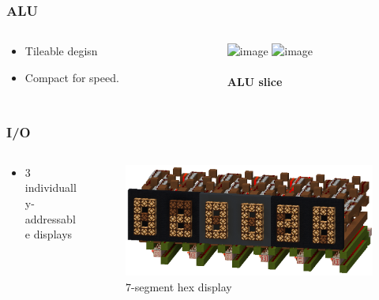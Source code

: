 \documentclass[aspectratio=169]{beamer}
\begin{document}
\begin{frame}
	\frametitle{ALU}
	\begin{columns}
		\begin{column}{0.4\textwidth}
			\begin{itemize}
				\item Tileable degisn
				\item Compact for speed.
			\end{itemize}
		\end{column}
		\begin{column}{0.6\textwidth}
			\begin{center}
				\includegraphics<1>[width=\textwidth]{imgs/alu_slice.png}
				\includegraphics<2->[width=0.8\textwidth]{imgs/alu.png}

				\framesubtitle<1>{ALU slice}
			\end{center}
		\end{column}
	\end{columns}
\end{frame}

\begin{frame}
	\frametitle{I/O}
	\begin{columns}
		\begin{column}{0.4\textwidth}
			\begin{itemize}
				\item $3$ individually-addressable displays
			\end{itemize}
		\end{column}
		\begin{column}{0.6\textwidth}
			\begin{figure}
				\includegraphics[width=\textwidth]{imgs/screen.png}
				\caption*{$7$-segment hex display}
			\end{figure}
		\end{column}
	\end{columns}
\end{frame}
\end{document}
